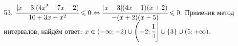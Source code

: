 53. $\cfrac{|x-3|(4x^2+7x-2)}{10+3x-x^2}\leqslant0\Leftrightarrow\cfrac{|x-3|(4x-1)(x+2)}{-(x+2)(x-5)}\leqslant0.$ Применив метод интервалов, найдём ответ: $x\in(-\infty;-2)\cup\left(-2;\cfrac{1}{4}\right]\cup\{3\}\cup(5;+\infty).$
\begin{figure}[ht!]
\end{figure}\\
